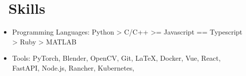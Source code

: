 \documentclass{resume}
\begin{document}
\section{\faCogs\ Skills}
\begin{itemize}[parsep=0.5ex]
  \item Programming Languages: Python > C/C++ >= Javascript == Typescript > Ruby > MATLAB
  \item Tools: PyTorch, Blender, OpenCV, Git, \LaTeX, Docker, Vue, React, FastAPI, Node.js, Rancher, Kubernetes,
\end{itemize}



\end{document}
